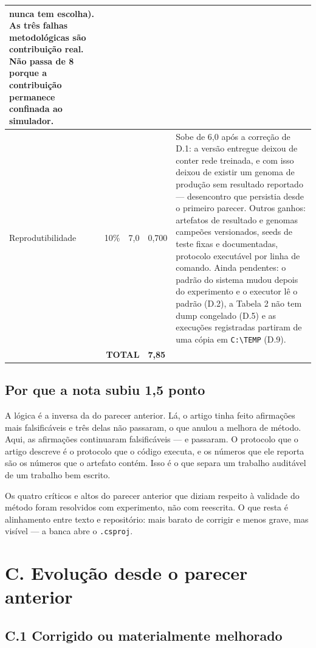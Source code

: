 \documentclass[11pt,a4paper]{article}
\begin{document}
\begin{longtable}{|p{4.1cm}|p{1.1cm}|p{1.1cm}|p{1.4cm}|p{6.6cm}|}
nunca tem escolha). As três falhas metodológicas são contribuição real. Não passa de 8 porque a
contribuição permanece confinada ao simulador. \\
\hline
Reprodutibilidade & 10\% & 7,0 & 0,700 &
Sobe de 6,0 após a correção de D.1: a versão entregue deixou de conter rede treinada, e com isso
deixou de existir um genoma de produção sem resultado reportado --- desencontro que persistia desde o
primeiro parecer. Outros ganhos: artefatos de resultado e genomas campeões versionados, seeds de
teste fixas e documentadas, protocolo executável por linha de comando. Ainda pendentes: o padrão do
sistema mudou depois do experimento e o executor lê o padrão (D.2), a Tabela 2 não tem dump congelado
(D.5) e as execuções registradas partiram de uma cópia em \texttt{C:\textbackslash TEMP} (D.9). \\
\hline
\multicolumn{3}{|r|}{\textbf{TOTAL}} & \textbf{7,85} & \\
\hline
\end{longtable}

\subsection*{Por que a nota subiu 1,5 ponto}

A lógica é a inversa da do parecer anterior. Lá, o artigo tinha feito afirmações mais falsificáveis e
três delas não passaram, o que anulou a melhora de método. Aqui, as afirmações continuaram
falsificáveis --- e passaram. O protocolo que o artigo descreve é o protocolo que o código executa, e
os números que ele reporta são os números que o artefato contém. Isso é o que separa um trabalho
auditável de um trabalho bem escrito.

Os quatro críticos e altos do parecer anterior que diziam respeito à validade do método foram
resolvidos com experimento, não com reescrita. O que resta é alinhamento entre texto e repositório:
mais barato de corrigir e menos grave, mas visível --- a banca abre o \texttt{.csproj}.

\section*{C. Evolução desde o parecer anterior}

\subsection*{C.1 Corrigido ou materialmente melhorado}
\end{document}

